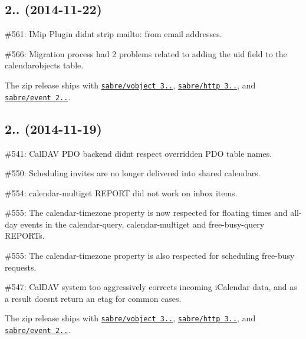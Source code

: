\subsection*{2.. (2014-\/11-\/22) }


\begin{DoxyItemize}
\item \#561\+: I\+Mip Plugin didn\textquotesingle{}t strip mailto\+: from email addresses.
\item \#566\+: Migration process had 2 problems related to adding the {\ttfamily uid} field to the {\ttfamily calendarobjects} table.
\item The zip release ships with \href{http://sabre.io/vobject/}{\tt sabre/vobject 3..}, \href{http://sabre.io/http/}{\tt sabre/http 3..}, and \href{http://sabre.io/event/}{\tt sabre/event 2..}.
\end{DoxyItemize}

\subsection*{2.. (2014-\/11-\/19) }


\begin{DoxyItemize}
\item \#541\+: Cal\+D\+AV P\+DO backend didn\textquotesingle{}t respect overridden P\+DO table names.
\item \#550\+: Scheduling invites are no longer delivered into shared calendars.
\item \#554\+: {\ttfamily calendar-\/multiget} {\ttfamily R\+E\+P\+O\+RT} did not work on inbox items.
\item \#555\+: The {\ttfamily calendar-\/timezone} property is now respected for floating times and all-\/day events in the {\ttfamily calendar-\/query}, {\ttfamily calendar-\/multiget} and {\ttfamily free-\/busy-\/query} R\+E\+P\+O\+R\+Ts.
\item \#555\+: The {\ttfamily calendar-\/timezone} property is also respected for scheduling free-\/busy requests.
\item \#547\+: Cal\+D\+AV system too aggressively \textquotesingle{}corrects\textquotesingle{} incoming i\+Calendar data, and as a result doesn\textquotesingle{}t return an etag for common cases.
\item The zip release ships with \href{http://sabre.io/vobject/}{\tt sabre/vobject 3..}, \href{http://sabre.io/http/}{\tt sabre/http 3..}, and \href{http://sabre.io/event/}{\tt sabre/event 2..}.
\end{DoxyItemize}

